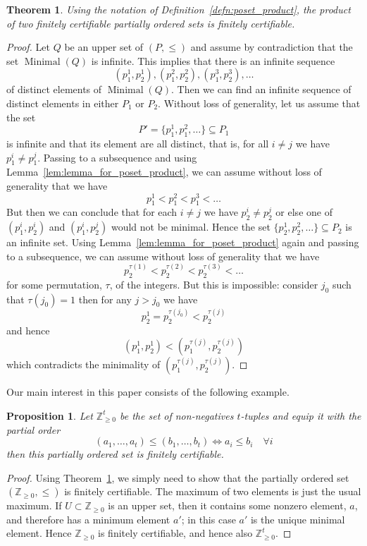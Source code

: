\documentclass{memo-l}
\theoremstyle{plain}
\newtheorem{proposition}[theorem]{Proposition}
\theoremstyle{definition}
\numberwithin{section}{chapter}
\numberwithin{equation}{chapter}
\DeclareMathOperator{\Minimal}{Minimal}
\theoremstyle{plain}
\newtheorem{thm}[theorem]{Theorem}
\theoremstyle{definition}
\newcommand\ZZ{\mathbb{Z}}
\begin{document}
\begin{thm}\label{thm:poset_product} Using the notation of 
Definition~\ref{defn:poset_product}, 
the product of two finitely certifiable partially
ordered sets is finitely certifiable.  \end{thm} \begin{proof} Let \( Q \)
be an upper set of \( (P, \leq) \) and assume by contradiction that the set
\( \Minimal(Q) \) is infinite. This implies that there is an infinite
sequence \[ (p_1^1,p_2^1), (p_1^2,p_2^2), (p_1^3, p_2^3), \ldots \] of
distinct elements of \( \Minimal(Q) \). Then we can find an infinite
sequence of distinct elements in either \( P_1\) or \(P_2\). Without loss
of generality, let us assume that the set \[ P' = \{ p_1^1, p_1^2, \ldots
\} \subseteq P_1 \] is infinite and that its element are all distinct, that
is, for all \( i \neq j \) we have \( p_1^i \neq p_1^j \). Passing to a
subsequence and using Lemma~\ref{lem:lemma_for_poset_product}, we can
assume without loss of generality that we have \[ p_1^1 < p_1^2 < p_1^3 <
\ldots \] But then we can conclude that for each \( i \neq j \) we have \(
p_2^i \neq p_2^j \) or else one of \( (p_1^i,p_2^i) \) and \( (p_1^i,
p_2^j) \) would not be minimal. Hence the set \( \{ p_2^1, p_2^2, \ldots \}
\subseteq P_2 \) is an infinite set. Using 
Lemma~\ref{lem:lemma_for_poset_product} again and passing to a subsequence, we
can assume without loss of generality that we have \[ p_2^{\tau(1)} <
p_2^{\tau(2)} < p_2^{\tau(3)} < \ldots \] for some permutation, \( \tau \),
of the integers. But this is impossible: consider \( j_0 \) such that \(
\tau(j_0) = 1 \) then for any \( j > j_0 \) we have \[ p_2^1 =
p_2^{\tau(j_0)} < p_2^{\tau(j)} \] and hence \[ (p_1^1,p_2^1) <
(p_1^{\tau(j)},p_2^{\tau(j)}) \] which contradicts the minimality of \(
(p_1^{\tau(j)},p_2^{\tau(j)}) \).  \end{proof}

Our main interest in this paper consists of the following example.

\begin{proposition} 
Let \( \ZZ^t_{\geq 0}\) be the set of non-negatives \(t\)-tuples
and equip it with the partial order \[ (a_1, \ldots, a_t) \leq (b_1,
\ldots, b_t) \iff a_i \leq b_i \quad \forall i \] then this partially
ordered set is finitely certifiable.  
\end{proposition} 
\begin{proof} Using Theorem~\ref{thm:poset_product}, 
we simply need to show that the partially ordered
set \( (\ZZ_{\geq 0}, \leq) \) is finitely certifiable. 
The maximum of two elements is just the usual maximum.
If $U\subset\ZZ_{\ge 0}$ is an upper set, then it contains some
nonzero element, $a$, and therefore has a minimum element
$a'$; in this case $a'$ is the unique minimal element.
Hence $\ZZ_{\ge 0}$ is finitely certifiable, and hence also
$\ZZ^t_{\ge 0}$.
\end{proof}
\end{document}

